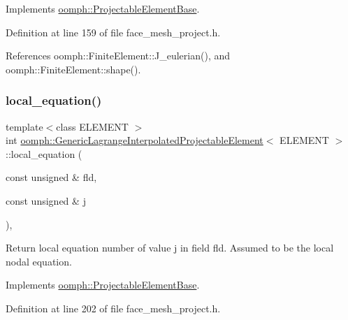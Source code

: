 Implements \hyperlink{classoomph_1_1ProjectableElementBase_ad45c21b58c0985d52f68ab2d79cbb488}{oomph\+::\+Projectable\+Element\+Base}.



Definition at line 159 of file face\+\_\+mesh\+\_\+project.\+h.



References oomph\+::\+Finite\+Element\+::\+J\+\_\+eulerian(), and oomph\+::\+Finite\+Element\+::shape().

\mbox{\label{classoomph_1_1GenericLagrangeInterpolatedProjectableElement_ab1d0d99536b2d4f1c935d39d01a943fa}} 
\subsubsection{\texorpdfstring{local\+\_\+equation()}{local\_equation()}}
{\footnotesize\ttfamily template$<$class E\+L\+E\+M\+E\+NT $>$ \\
int \hyperlink{classoomph_1_1GenericLagrangeInterpolatedProjectableElement}{oomph\+::\+Generic\+Lagrange\+Interpolated\+Projectable\+Element}$<$ E\+L\+E\+M\+E\+NT $>$\+::local\+\_\+equation (\begin{DoxyParamCaption}\item[{const unsigned \&}]{fld,  }\item[{const unsigned \&}]{j }\end{DoxyParamCaption})\hspace{0.3cm}{\ttfamily [inline]}, {\ttfamily [virtual]}}



Return local equation number of value j in field fld. Assumed to be the local nodal equation. 



Implements \hyperlink{classoomph_1_1ProjectableElementBase_ac5c27ae929ff636dc7747fe23fd4f738}{oomph\+::\+Projectable\+Element\+Base}.



Definition at line 202 of file face\+\_\+mesh\+\_\+project.\+h.



